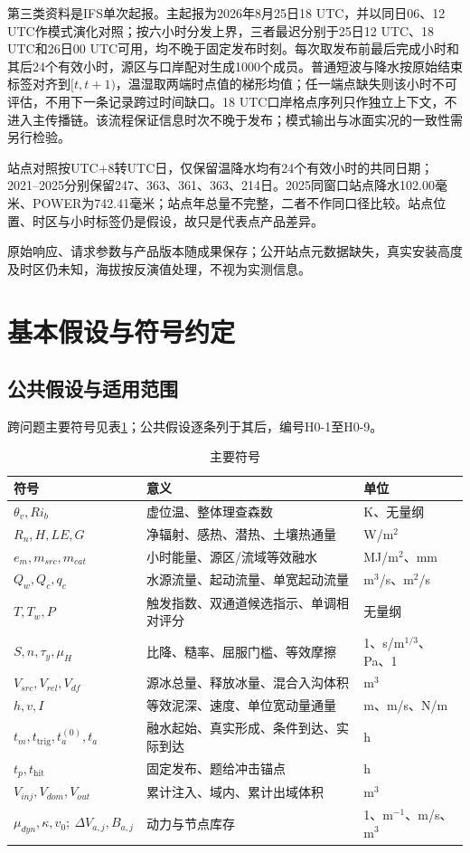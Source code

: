 第三类资料是IFS单次起报。主起报为2026年8月25日18 UTC，并以同日06、12 UTC作模式演化对照；按六小时分发上界，三者最迟分别于25日12 UTC、18 UTC和26日00 UTC可用，均不晚于固定发布时刻。每次取发布前最后完成小时和其后24个有效小时，源区与口岸配对生成1000个成员。普通短波与降水按原始结束标签对齐到$[t,t+1)$，温湿取两端时点值的梯形均值；任一端点缺失则该小时不可评估，不用下一条记录跨过时间缺口。18 UTC口岸格点序列只作独立上下文，不进入主传播链。该流程保证信息时次不晚于发布；模式输出与冰面实况的一致性需另行检验。

站点对照按UTC+8转UTC日，仅保留温降水均有24个有效小时的共同日期；2021--2025分别保留247、363、361、363、214日。2025同窗口站点降水102.00毫米、POWER为742.41毫米；站点年总量不完整，二者不作同口径比较。站点位置、时区与小时标签仍是假设，故只是代表点产品差异。

原始响应、请求参数与产品版本随成果保存；公开站点元数据缺失，真实安装高度及时区仍未知，海拔按反演值处理，不视为实测信息。



\section{基本假设与符号约定}
\subsection{公共假设与适用范围}
跨问题主要符号见表\ref{tab:symbols}；公共假设逐条列于其后，编号H0-1至H0-9。

\begin{table}[htbp]\centering\footnotesize
\caption{主要符号}\label{tab:symbols}
\begin{tabular}{@{}l l l@{}}\toprule
符号&意义&单位\\\midrule
$\theta_v,Ri_b$&虚位温、整体理查森数&K、无量纲\\
$R_n,H,LE,G$&净辐射、感热、潜热、土壤热通量&W/m$^2$\\
$e_m,m_{src},m_{cat}$&小时能量、源区/流域等效融水&MJ/m$^2$、mm\\
$Q_w,Q_c,q_c$&水源流量、起动流量、单宽起动流量&m$^3$/s、m$^2$/s\\
$T,T_w,P$&触发指数、双通道候选指示、单调相对评分&无量纲\\
$S,n,\tau_y,\mu_H$&比降、糙率、屈服门槛、等效摩擦&1、s/m$^{1/3}$、Pa、1\\
$V_{src},V_{rel},V_{df}$&源冰总量、释放冰量、混合入沟体积&m$^3$\\
$h,v,I$&等效泥深、速度、单位宽动量通量&m、m/s、N/m\\
$t_m,t_{\mathrm{trig}},t_a^{(0)},t_a$&融水起始、真实形成、条件到达、实际到达&h\\
$t_p,t_{\mathrm{hit}}$&固定发布、题给冲击锚点&h\\
$V_{inj},V_{dom},V_{out}$&累计注入、域内、累计出域体积&m$^3$\\
$\mu_{dyn},\kappa,v_0;\ \Delta V_{a,j},B_{a,j}$&动力与节点库存&1、m$^{-1}$、m/s、m$^3$\\\bottomrule
\end{tabular}\end{table}

